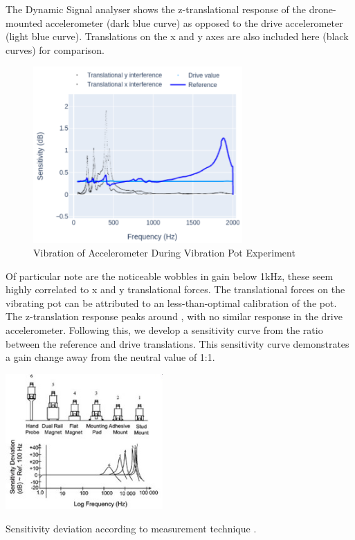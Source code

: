 The Dynamic Signal analyser shows the z-translational response of the drone-mounted accelerometer (dark blue curve) as opposed to the drive accelerometer (light blue curve). Translations on the x and y axes are also included here (black curves) for comparison.

    \begin{figure}[!h]
        \raggedright
        \hspace{1cm}
        \includegraphics[width=8cm]{images/stage_graphs/vibration_results/experimental_results_vibratingpot_crop_neat.png}
        \caption{Vibration of Accelerometer During Vibration Pot Experiment}
    \end{figure}

\textbf{} Of particular note are the noticeable wobbles in gain below 1kHz, these seem highly correlated to x and y translational forces. The translational forces on the vibrating pot can be attributed to an less-than-optimal calibration of the pot. The z-translation response peaks around , with no similar response in the drive accelerometer. Following this, we develop a sensitivity curve from the ratio between the reference and drive translations. This sensitivity curve demonstrates a gain change away from the neutral value of 1:1. 
    \begin{marginfigure}%
      \includegraphics[width=6cm]{images/stage_graphs/accelero_ref.jpg}
      \caption{ Sensitivity deviation according to measurement technique \cite{safe_load_testing_technologies_2021}.}
      \label{fig:measurement_techniques_B}
    \end{marginfigure}
    
